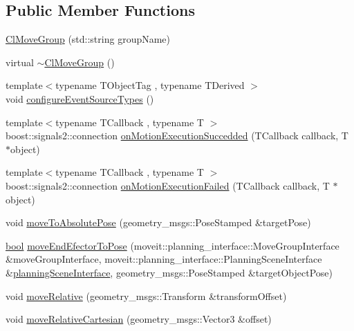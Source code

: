 \subsection*{Public Member Functions}
\begin{DoxyCompactItemize}
\item 
\hyperlink{classsm__moveit_1_1cl__movegroup_1_1ClMoveGroup_a996b92fda56d04827995d6a012430f36}{Cl\+Move\+Group} (std\+::string group\+Name)
\item 
virtual \hyperlink{classsm__moveit_1_1cl__movegroup_1_1ClMoveGroup_a8cf4cd423cc40c8c1a735450a165f2c4}{$\sim$\+Cl\+Move\+Group} ()
\item 
{\footnotesize template$<$typename T\+Object\+Tag , typename T\+Derived $>$ }\\void \hyperlink{classsm__moveit_1_1cl__movegroup_1_1ClMoveGroup_a5e90b33e031149241eaa4159304f3009}{configure\+Event\+Source\+Types} ()
\item 
{\footnotesize template$<$typename T\+Callback , typename T $>$ }\\boost\+::signals2\+::connection \hyperlink{classsm__moveit_1_1cl__movegroup_1_1ClMoveGroup_a5359b864e258cb51d0d7ff7ffc615b58}{on\+Motion\+Execution\+Succedded} (T\+Callback callback, T $\ast$object)
\item 
{\footnotesize template$<$typename T\+Callback , typename T $>$ }\\boost\+::signals2\+::connection \hyperlink{classsm__moveit_1_1cl__movegroup_1_1ClMoveGroup_a6c869d27e767840b9ac437d838394c79}{on\+Motion\+Execution\+Failed} (T\+Callback callback, T $\ast$object)
\item 
void \hyperlink{classsm__moveit_1_1cl__movegroup_1_1ClMoveGroup_a6b85fe06800db92b08346603e5d2eabb}{move\+To\+Absolute\+Pose} (geometry\+\_\+msgs\+::\+Pose\+Stamped \&target\+Pose)
\item 
\hyperlink{classbool}{bool} \hyperlink{classsm__moveit_1_1cl__movegroup_1_1ClMoveGroup_a63291ecb539af417046c2bcb1227aebf}{move\+End\+Efector\+To\+Pose} (moveit\+::planning\+\_\+interface\+::\+Move\+Group\+Interface \&move\+Group\+Interface, moveit\+::planning\+\_\+interface\+::\+Planning\+Scene\+Interface \&\hyperlink{classsm__moveit_1_1cl__movegroup_1_1ClMoveGroup_a26b5c9e0aef1cd67ee977a756b69cf76}{planning\+Scene\+Interface}, geometry\+\_\+msgs\+::\+Pose\+Stamped \&target\+Object\+Pose)
\item 
void \hyperlink{classsm__moveit_1_1cl__movegroup_1_1ClMoveGroup_ad0352e787798f020d24ba9c1c58413bb}{move\+Relative} (geometry\+\_\+msgs\+::\+Transform \&transform\+Offset)
\item 
void \hyperlink{classsm__moveit_1_1cl__movegroup_1_1ClMoveGroup_ad5ca2f92076405346319aa20e5d4dffb}{move\+Relative\+Cartesian} (geometry\+\_\+msgs\+::\+Vector3 \&offset)
\end{DoxyCompactItemize}
